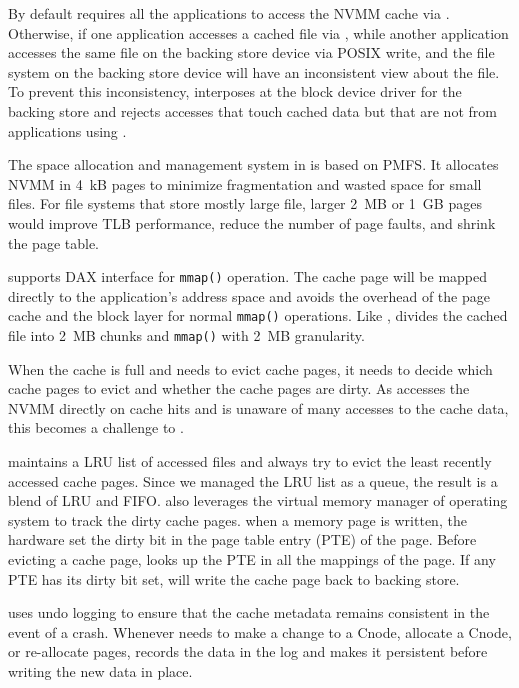 By default \CChell{} requires all the applications to access the NVMM cache via
\lib{}.  Otherwise, if one application accesses a cached file via \CChell{}, while another
application accesses the same file on the backing store device via POSIX write,
\CChell{} and the file system on the backing store device will have an
inconsistent view about the file.  To prevent this inconsistency, \drv{}
interposes at the block device driver for the backing store and rejects
accesses that touch cached data but that are not from applications using \lib{}.


The space allocation and management system in \drv{} is based on PMFS.  It
allocates NVMM in 4~kB pages to minimize fragmentation and wasted space for
small files.  For file systems that store mostly large file, larger 2~MB or
1~GB pages would improve
TLB performance, reduce the number of page faults, and shrink the page table.

\CChell supports DAX interface for \texttt{mmap()} operation.
The cache page will be mapped directly to the application's
address space and avoids the overhead of the page cache and the block layer
for normal \texttt{mmap()} operations.
Like \DAChell{}, \CChell{} divides the cached file into 2~MB chunks and
\texttt{mmap()} with 2~MB granularity.

When the cache is full and \drv{}
needs to evict cache pages, it needs to decide which cache pages to evict
and whether the cache pages are dirty. As \lib{} accesses the NVMM directly
on cache hits and \drv{} is unaware of many accesses to the cache data, this
becomes a challenge to \drv{}.

\drv{} maintains a LRU list of accessed files and always try to evict the least
recently accessed cache pages. Since we managed the LRU list as a queue,
the result is a blend of LRU and FIFO.
\CChell{} also leverages the virtual memory manager of operating system to
track the dirty cache pages. 
when a memory page is written, the hardware set the dirty bit in the 
page table entry (PTE) of the page. Before evicting a cache page,
\drv{} looks up the PTE in all the mappings of the page.  If
any PTE has its dirty bit set, \drv{} will write the cache page back to
backing store.

\CChell{} uses undo logging to ensure that the cache metadata remains
consistent in the event of a crash.  Whenever \drv{} needs to make
a change to a Cnode, allocate a Cnode, or re-allocate pages,
\drv{} records the data in the log and makes it persistent before writing
the new data in place.

